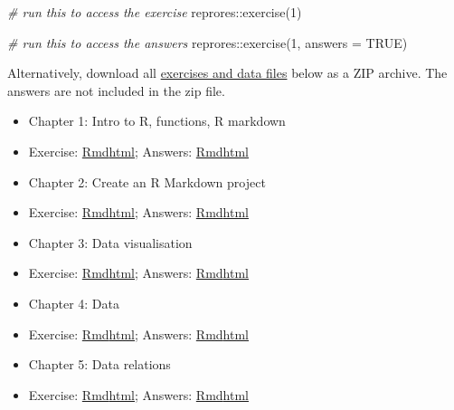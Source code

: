 \documentclass[
  oneside]{book}
\newenvironment{Shaded}{\begin{snugshade}}{\end{snugshade}}
\newcommand{\AttributeTok}[1]{\textcolor[rgb]{0.77,0.63,0.00}{#1}}
\newcommand{\CommentTok}[1]{\textcolor[rgb]{0.56,0.35,0.01}{\textit{#1}}}
\newcommand{\ConstantTok}[1]{\textcolor[rgb]{0.00,0.00,0.00}{#1}}
\newcommand{\DecValTok}[1]{\textcolor[rgb]{0.00,0.00,0.81}{#1}}
\newcommand{\FunctionTok}[1]{\textcolor[rgb]{0.00,0.00,0.00}{#1}}
\newcommand{\NormalTok}[1]{#1}
\newcommand{\SpecialCharTok}[1]{\textcolor[rgb]{0.00,0.00,0.00}{#1}}
\providecommand{\tightlist}{%
  \setlength{\itemsep}{0pt}\setlength{\parskip}{0pt}}
\begin{document}
\begin{Shaded}
\begin{Highlighting}[]
\CommentTok{\# run this to access the exercise}
\NormalTok{reprores}\SpecialCharTok{::}\FunctionTok{exercise}\NormalTok{(}\DecValTok{1}\NormalTok{)}

\CommentTok{\# run this to access the answers}
\NormalTok{reprores}\SpecialCharTok{::}\FunctionTok{exercise}\NormalTok{(}\DecValTok{1}\NormalTok{, }\AttributeTok{answers =} \ConstantTok{TRUE}\NormalTok{)}
\end{Highlighting}
\end{Shaded}

Alternatively, download all \href{exercises/exercises.zip}{exercises and data files} below as a ZIP archive. The answers are not included in the zip file.

\begin{itemize}
\tightlist
\item
  Chapter 1: Intro to R, functions, R markdown
\item
  Exercise: \href{exercises/01_intro_exercise.Rmd}{Rmd}\textbar{}\href{exercises/01_intro_exercise.html}{html}; Answers: \href{exercises/01_intro_answers.Rmd}{Rmd}\textbar{}\href{exercises/01_intro_answers.html}{html}
\item
  Chapter 2: Create an R Markdown project
\item
  Exercise: \href{exercises/02_repro_exercise.Rmd}{Rmd}\textbar{}\href{exercises/02_repro_exercise.html}{html}; Answers: \href{exercises/02_repro_answers.Rmd}{Rmd}\textbar{}\href{exercises/02_repro_answers.html}{html}
\item
  Chapter 3: Data visualisation
\item
  Exercise: \href{exercises/03_ggplot_exercise.Rmd}{Rmd}\textbar{}\href{exercises/03_ggplot_exercise.html}{html}; Answers: \href{exercises/03_ggplot_answers.Rmd}{Rmd}\textbar{}\href{exercises/03_ggplot_answers.html}{html}
\item
  Chapter 4: Data
\item
  Exercise: \href{exercises/04_data_exercise.Rmd}{Rmd}\textbar{}\href{exercises/04_data_exercise.html}{html}; Answers: \href{exercises/04_data_answers.Rmd}{Rmd}\textbar{}\href{exercises/04_data_answers.html}{html}
\item
  Chapter 5: Data relations
\item
  Exercise: \href{exercises/05_joins_exercise.Rmd}{Rmd}\textbar{}\href{exercises/05_joins_exercise.html}{html}; Answers: \href{exercises/05_joins_answers.Rmd}{Rmd}\textbar{}\href{exercises/05_joins_answers.html}{html}

\end{itemize}
\end{document}
